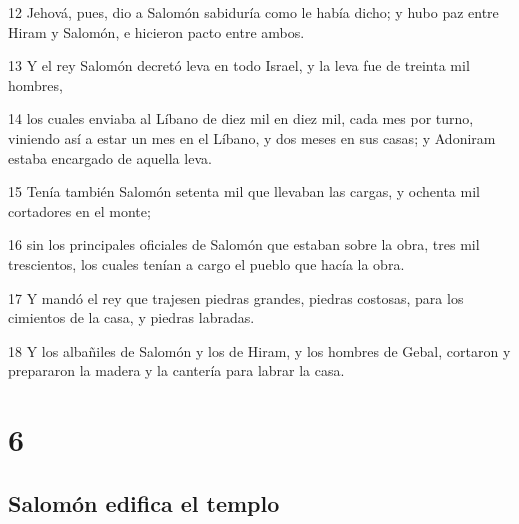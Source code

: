 \par 12 Jehová, pues, dio a Salomón sabiduría como le había dicho; y hubo paz entre Hiram y Salomón, e hicieron pacto entre ambos.
\par 13 Y el rey Salomón decretó leva en todo Israel, y la leva fue de treinta mil hombres,
\par 14 los cuales enviaba al Líbano de diez mil en diez mil, cada mes por turno, viniendo así a estar un mes en el Líbano, y dos meses en sus casas; y Adoniram estaba encargado de aquella leva.
\par 15 Tenía también Salomón setenta mil que llevaban las cargas, y ochenta mil cortadores en el monte;
\par 16 sin los principales oficiales de Salomón que estaban sobre la obra, tres mil trescientos, los cuales tenían a cargo el pueblo que hacía la obra.
\par 17 Y mandó el rey que trajesen piedras grandes, piedras costosas, para los cimientos de la casa, y piedras labradas.
\par 18 Y los albañiles de Salomón y los de Hiram, y los hombres de Gebal, cortaron y prepararon la madera y la cantería para labrar la casa.

\chapter{6}

\section*{Salomón edifica el templo}

